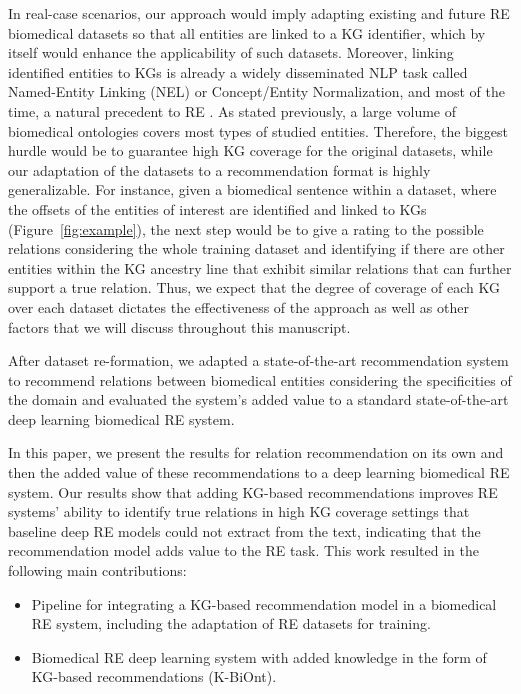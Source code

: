 In real-case scenarios, our approach would imply adapting existing and future RE biomedical datasets so that all entities are linked to a KG identifier, which by itself would enhance the applicability of such datasets. Moreover, linking identified entities to KGs is already a widely disseminated NLP task called Named-Entity Linking (NEL) or Concept/Entity Normalization, and most of the time, a natural precedent to RE \citep{huang2020biomedical}. As stated previously, a large volume of biomedical ontologies covers most types of studied entities. Therefore, the biggest hurdle would be to guarantee high KG coverage for the original datasets, while our adaptation of the datasets to a recommendation format is highly generalizable. For instance, given a biomedical sentence within a dataset, where the offsets of the entities of interest are identified and linked to KGs (Figure~\ref{fig:example}), the next step would be to give a rating to the possible relations considering the whole training dataset and identifying if there are other entities within the KG ancestry line that exhibit similar relations that can further support a true relation. Thus, we expect that the degree of coverage of each KG over each dataset dictates the effectiveness of the approach as well as other factors that we will discuss throughout this manuscript. 

After dataset re-formation, we adapted a state-of-the-art recommendation system to recommend relations between biomedical entities considering the specificities of the domain and evaluated the system's added value to a standard state-of-the-art deep learning biomedical RE system. 

In this paper, we present the results for relation recommendation on its own and then the added value of these recommendations to a deep learning biomedical RE system. Our results show that adding KG-based recommendations improves RE systems' ability to identify true relations in high KG coverage settings that baseline deep RE models could not extract from the text, indicating that the recommendation model adds value to the RE task. This work resulted in the following main contributions:

\begin{itemize}
    \item Pipeline for integrating a KG-based recommendation model in a biomedical RE system, including the adaptation of RE datasets for training. 
    \item Biomedical RE deep learning system with added knowledge in the form of KG-based recommendations (K-BiOnt).
\end{itemize}

